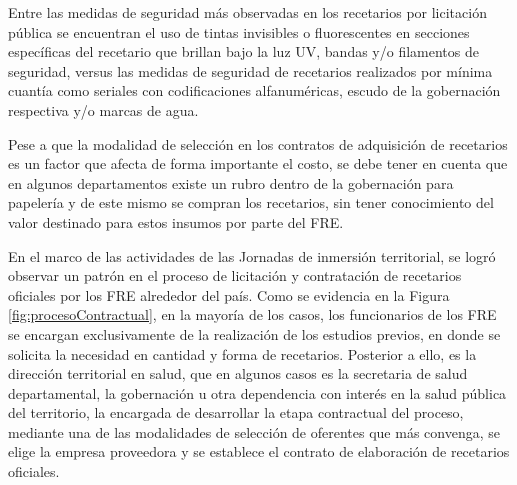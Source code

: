 \documentclass[
]{book}
\begin{document}
Entre las medidas de seguridad más observadas en los recetarios por licitación pública se encuentran el uso de tintas invisibles o fluorescentes en secciones específicas del recetario que brillan bajo la luz UV, bandas y/o filamentos de seguridad, versus las medidas de seguridad de recetarios realizados por mínima cuantía como seriales con codificaciones alfanuméricas, escudo de la gobernación respectiva y/o marcas de agua.

Pese a que la modalidad de selección en los contratos de adquisición de recetarios es un factor que afecta de forma importante el costo, se debe tener en cuenta que en algunos departamentos existe un rubro dentro de la gobernación para papelería y de este mismo se compran los recetarios, sin tener conocimiento del valor destinado para estos insumos por parte del FRE.

En el marco de las actividades de las Jornadas de inmersión territorial, se logró observar un patrón en el proceso de licitación y contratación de recetarios oficiales por los FRE alrededor del país. Como se evidencia en la Figura \ref{fig:procesoContractual}, en la mayoría de los casos, los funcionarios de los FRE se encargan exclusivamente de la realización de los estudios previos, en donde se solicita la necesidad en cantidad y forma de recetarios. Posterior a ello, es la dirección territorial en salud, que en algunos casos es la secretaria de salud departamental, la gobernación u otra dependencia con interés en la salud pública del territorio, la encargada de desarrollar la etapa contractual del proceso, mediante una de las modalidades de selección de oferentes que más convenga, se elige la empresa proveedora y se establece el contrato de elaboración de recetarios oficiales.
\end{document}
